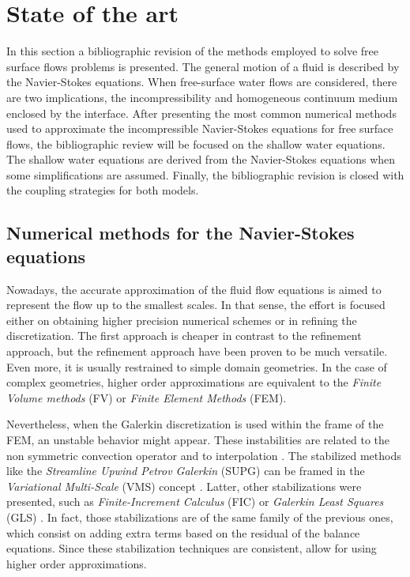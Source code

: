 
\section{State of the art}
\label{state_art}


In this section a bibliographic revision of the methods employed to solve free surface flows problems is presented.
The general motion of a fluid is described by the Navier-Stokes equations. When free-surface water flows are considered, there are two implications, the incompressibility and homogeneous continuum medium enclosed by the interface. After presenting the most common numerical methods used to approximate the incompressible Navier-Stokes equations for free surface flows, the bibliographic review will be focused on the shallow water equations.
The shallow water equations are derived from the Navier-Stokes equations when some simplifications are assumed.
Finally, the bibliographic revision is closed with the coupling strategies for both models.



\subsection{Numerical methods for the Navier-Stokes equations}


Nowadays, the accurate approximation of the fluid flow equations is aimed to represent the flow up to the smallest scales. In that sense, the effort is focused either on obtaining higher precision numerical schemes or in refining the discretization. The first approach is cheaper in contrast to the refinement approach, but the refinement approach have been proven to be much versatile. Even more, it is usually restrained to simple domain geometries. In the case of complex geometries, higher order approximations are equivalent to the \emph{Finite Volume methods} (FV) or \emph{Finite Element Methods} (FEM).

Nevertheless, when the Galerkin discretization is used within the frame of the FEM, an unstable behavior might appear. These instabilities are related to the non symmetric convection operator and to interpolation \cite{brezzi1991,codina2008oseen}. The stabilized methods like the \emph{Streamline Upwind Petrov Galerkin} (SUPG) \cite{hughes1986iii,brooks1982} can be framed in the \emph{Variational Multi-Scale} (VMS) concept \cite{hughes1995}. Latter, other stabilizations were presented, such as \emph{Finite-Increment Calculus} (FIC) \cite{onate1998} or \emph{Galerkin Least Squares} (GLS) \cite{hughes1989}. In fact, those stabilizations are of the same family of the previous ones, which consist on adding extra terms based on the residual of the balance equations. Since these stabilization techniques are consistent, allow for using higher order approximations.

